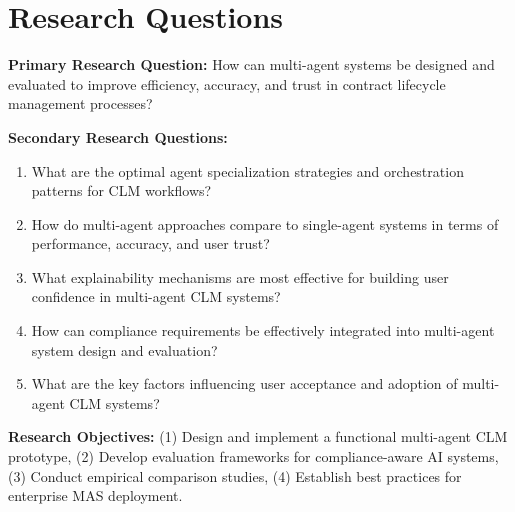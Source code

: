 
\section{Research Questions}\label{section:research_questions}

\textbf{Primary Research Question:} How can multi-agent systems be designed and evaluated to improve efficiency, accuracy, and trust in contract lifecycle management processes?

\textbf{Secondary Research Questions:}
\begin{enumerate}
    \item What are the optimal agent specialization strategies and orchestration patterns for CLM workflows?
    \item How do multi-agent approaches compare to single-agent systems in terms of performance, accuracy, and user trust?
    \item What explainability mechanisms are most effective for building user confidence in multi-agent CLM systems?
    \item How can compliance requirements be effectively integrated into multi-agent system design and evaluation?
    \item What are the key factors influencing user acceptance and adoption of multi-agent CLM systems?
\end{enumerate}

\textbf{Research Objectives:} (1) Design and implement a functional multi-agent CLM prototype, (2) Develop evaluation frameworks for compliance-aware AI systems, (3) Conduct empirical comparison studies, (4) Establish best practices for enterprise MAS deployment.
